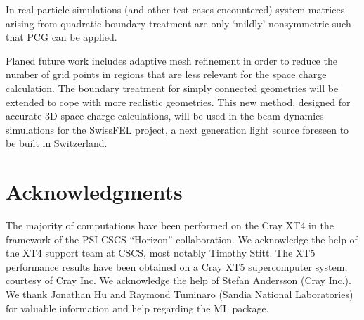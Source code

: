 \documentclass[a4paper,10pt,3p,final,pdftex]{elsarticle}
\begin{document}
In real particle simulations (and other test cases encountered) system
matrices arising from quadratic boundary treatment are only `mildly'
nonsymmetric such that PCG can be applied.

Planed future work includes adaptive mesh refinement in order to reduce
the number of grid points in regions that are less relevant for the
space charge calculation.  The boundary treatment for simply connected
geometries will be extended to cope with more realistic geometries.  This
new method, designed for accurate 3D space charge calculations, will be
used in the beam dynamics simulations for the SwissFEL project, a next
generation light source foreseen to be built in Switzerland.

\section*{Acknowledgments}

The majority of computations have been performed on the Cray XT4 in the
framework of the PSI CSCS ``Horizon'' collaboration.  We acknowledge the
help of the XT4 support team at CSCS, most notably Timothy Stitt.
The XT5 performance results have been obtained on a Cray XT5
supercomputer system, courtesy of Cray Inc.  We acknowledge the help of
Stefan Andersson (Cray Inc.).
We thank Jonathan Hu and Raymond Tuminaro (Sandia National Laboratories)
for valuable information and help regarding the ML package.



\end{document}
